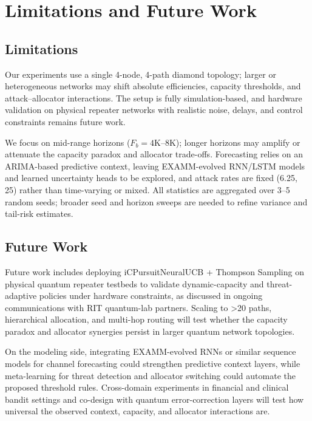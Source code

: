 \documentclass[11pt,a4paper]{article}
\begin{document}
\section{Limitations and Future Work}
\label{sec:limitations}

\subsection{Limitations}

Our experiments use a single 4-node, 4-path diamond topology; larger or heterogeneous networks may shift absolute efficiencies, capacity thresholds, and attack--allocator interactions. The setup is fully simulation-based, and hardware validation on physical repeater networks with realistic noise, delays, and control constraints remains future work.

We focus on mid-range horizons ($F_b = 4\text{K}–8\text{K}$); longer horizons may amplify or attenuate the capacity paradox and allocator trade-offs. Forecasting relies on an ARIMA-based predictive context, leaving EXAMM-evolved RNN/LSTM models and learned uncertainty heads to be explored, and attack rates are fixed (6.25, 25) rather than time-varying or mixed. All statistics are aggregated over 3--5 random seeds; broader seed and horizon sweeps are needed to refine variance and tail-risk estimates.

\subsection{Future Work}

Future work includes deploying iCPursuitNeuralUCB + Thompson Sampling on physical quantum repeater testbeds to validate dynamic-capacity and threat-adaptive policies under hardware constraints, as discussed in ongoing communications with RIT quantum-lab partners. Scaling to >20 paths, hierarchical allocation, and multi-hop routing will test whether the capacity paradox and allocator synergies persist in larger quantum network topologies.

On the modeling side, integrating EXAMM-evolved RNNs or similar sequence models for channel forecasting could strengthen predictive context layers, while meta-learning for threat detection and allocator switching could automate the proposed threshold rules. Cross-domain experiments in financial and clinical bandit settings and co-design with quantum error-correction layers will test how universal the observed context, capacity, and allocator interactions are.
\end{document}
